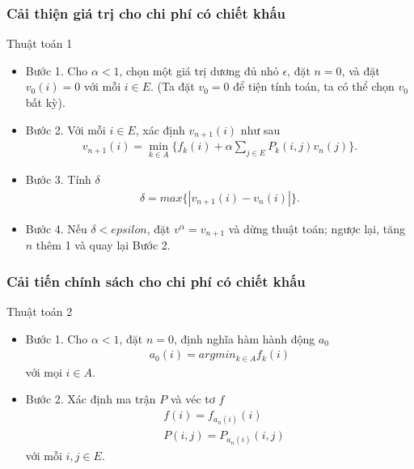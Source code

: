 \documentclass[12pt]{beamer}
\begin{document}
\begin{frame}
	\frametitle{Cải thiện giá trị cho chi phí có
		chiết khấu}
\begin{exampleblock}{Thuật toán 1}
\begin{itemize}
	\item
	Bước 1. Cho $\alpha <1$, chọn một giá trị dương đủ nhỏ $\epsilon$, đặt $n=0$, và đặt $v_0(i)=0$ với mỗi $i \in E$. (Ta đặt $v_0 =0$ để tiện tính toán, ta có thể chọn $v_0$ bất kỳ).
	
    \item
	Bước 2. Với mỗi $i \in E$, xác định $v_{n+1}(i)$ như sau
	\begin{align*}
	v_{n+1}(i)=\underset{k \in A}{\min}\{f_k(i)+\alpha \sum_{j\in E} P_k(i,j)v_n(j)\}.
	\end{align*}
	
    \item
	Bước 3. Tính $\delta$
	\begin{align*}
	\delta=max\{|v_{n+1}(i)-v_{n}(i)|\}.
	\end{align*}
	
    \item
	Bước 4. Nếu $\delta<epsilon$, đặt $v^\alpha =v_{n+1}$ và dừng thuật toán; ngược lại, tăng $n$ thêm 1 và quay lại Bước 2.
	\end{itemize}
\end{exampleblock}
\end{frame}

\begin{frame}
	\frametitle{Cải tiến chính sách cho chi phí có
		chiết khấu}
	\begin{exampleblock}{Thuật toán 2}
		\begin{itemize}
			\item
			Bước 1. Cho $\alpha <1$, đặt $n=0$, định nghĩa hàm hành động $a_0$
			\begin{align*}
			a_0(i)=argmin_{k \in A}f_k(i)
			\end{align*}
			với mọi $i \in A$.
			
		\item
			Bước 2. Xác định ma trận $P$ và véc tơ $f$
			\begin{align*}
			&f(i)=f_{a_n(i)}(i)\\
			&P(i,j)=P_{a_n(i)}(i,j)
			\end{align*} 
			với mỗi $i,j \in E$.
			
			\end{itemize}
	\end{exampleblock}
	\end{frame}
\end{document}
